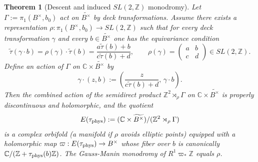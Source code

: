 \documentclass[11pt]{article}
\newtheorem{theorem}{Theorem}[section]
\theoremstyle{remark}
\newcommand{\Z}{\mathbb{Z}}
\begin{document}
{\begin{theorem}[Descent and induced $SL(2,\mathbb{Z})$ monodromy]
\label{thm:descent_monodromy}
Let $\Gamma:=\pi_1(B^{\times},b_0)$ act on $\widetilde{B^{\times}}$ by deck transformations.
Assume there exists a representation $\rho:\pi_1(B^\times,b_0)\to SL(2,\Z)$ such that for every deck
transformation $\gamma$ and every $b\in \widetilde{B^\times}$ one has the equivariance condition
\begin{equation}\label{eq:tau-equivariant}
\tilde\tau(\gamma\cdot b)=\rho(\gamma)\cdot \tilde\tau(b)=\frac{a\tilde\tau(b)+b}{c\tilde\tau(b)+d},
\qquad
\rho(\gamma)=\begin{pmatrix}a&b\\ c&d\end{pmatrix}\in SL(2,\Z).
\end{equation}
Define an action of $\Gamma$ on $\mathbb{C}\times\widetilde{B^{\times}}$ by
\begin{equation}
\gamma\cdot(z,b) := \left(\frac{z}{c\widetilde{\tau}(b)+d},\, \gamma\cdot b\right).
\end{equation}
Then the combined action of the semidirect product $\mathbb{Z}^2\rtimes_\rho \Gamma$ on $\mathbb{C}\times\widetilde{B^{\times}}$
is properly discontinuous and holomorphic, and the quotient
\begin{equation}
E(\tau_{\rm phys}) := (\mathbb{C}\times\widetilde{B^{\times}})/(\mathbb{Z}^2\rtimes_\rho \Gamma)
\end{equation}
is a complex orbifold (a manifold if $\rho$ avoids elliptic points) equipped with a holomorphic map
$\varpi:E(\tau_{\rm phys})\to B^{\times}$ whose fiber over $b$ is canonically $\mathbb{C}/(\mathbb{Z}+\tau_{\rm phys}(b)\mathbb{Z})$.
The Gauss-Manin monodromy of $R^1\varpi_*\mathbb{Z}$ equals $\rho$.
\end{theorem}

}
\end{document}
